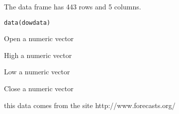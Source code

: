 \begin{Description}\relax
The  data frame has 443 rows and 5 columns.
\end{Description}
\begin{Usage}
\begin{verbatim}data(dowdata)\end{verbatim}
\end{Usage}
\begin{Format}\relax
\item[Open] a numeric vector
\item[High] a numeric vector
\item[Low] a numeric vector
\item[Close] a numeric vector
\end{Format}
\begin{Source}\relax
this data comes from the site http://www.forecasts.org/
\end{Source}
\begin{Examples}
\end{Examples}

